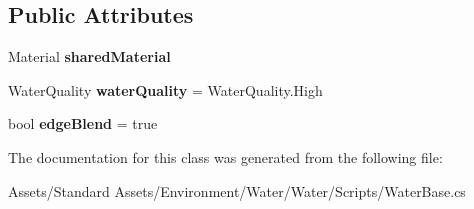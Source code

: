 \subsection*{Public Attributes}
\begin{DoxyCompactItemize}
\item 
Material {\bfseries shared\+Material}\hypertarget{class_unity_standard_assets_1_1_water_1_1_water_base_a7aff509c9ae54c5a455fa2056111dc4d}{}\label{class_unity_standard_assets_1_1_water_1_1_water_base_a7aff509c9ae54c5a455fa2056111dc4d}

\item 
Water\+Quality {\bfseries water\+Quality} = Water\+Quality.\+High\hypertarget{class_unity_standard_assets_1_1_water_1_1_water_base_a55893c3ad6b86eef9d154125f16abc08}{}\label{class_unity_standard_assets_1_1_water_1_1_water_base_a55893c3ad6b86eef9d154125f16abc08}

\item 
bool {\bfseries edge\+Blend} = true\hypertarget{class_unity_standard_assets_1_1_water_1_1_water_base_a23c9f9595d0fa2ab78192d0fa014d61e}{}\label{class_unity_standard_assets_1_1_water_1_1_water_base_a23c9f9595d0fa2ab78192d0fa014d61e}

\end{DoxyCompactItemize}


The documentation for this class was generated from the following file\+:\begin{DoxyCompactItemize}
\item 
Assets/\+Standard Assets/\+Environment/\+Water/\+Water/\+Scripts/Water\+Base.\+cs\end{DoxyCompactItemize}
